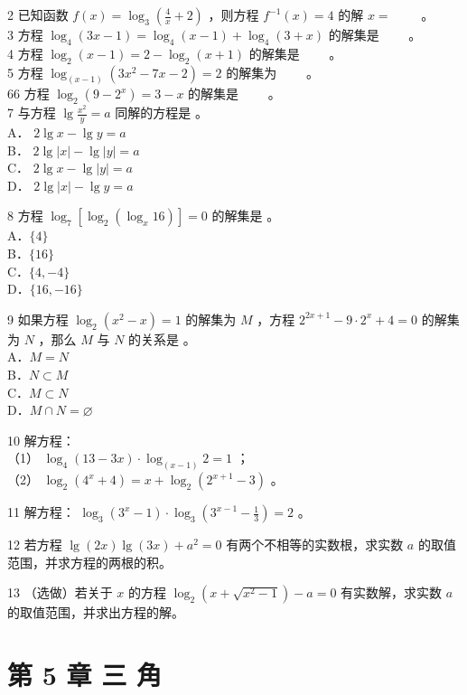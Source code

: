 \documentclass[10pt]{article}
\begin{document}
2 已知函数 \(f(x)=\log _{3}\left(\frac{4}{x}+2\right)\) ，则方程 \(f^{-1}(x)=4\) 的解 \(x=\) \(\qquad\)。\\
3 方程 \(\log _{4}(3 x-1)=\log _{4}(x-1)+\log _{4}(3+x)\) 的解集是 \(\qquad\)。\\
4 方程 \(\log _{2}(x-1)=2-\log _{2}(x+1)\) 的解集是 \(\qquad\)。\\
5 方程 \(\log _{(x-1)}\left(3 x^{2}-7 x-2\right)=2\) 的解集为 \(\qquad\)。\\
66 方程 \(\log _{2}\left(9-2^{x}\right)=3-x\) 的解集是 \(\qquad\)。\\
7 与方程 \(\lg \frac{x^{2}}{y}=a\) 同解的方程是 。\\
A． \(2 \lg x-\lg y=a\)\\
B． \(2 \lg |x|-\lg |y|=a\)\\
C． \(2 \lg x-\lg |y|=a\)\\
D． \(2 \lg |x|-\lg y=a\)

8 方程 \(\log _{7}\left[\log _{2}\left(\log _{x} 16\right)\right]=0\) 的解集是 。\\
A．\(\{4\}\)\\
B．\(\{16\}\)\\
C．\(\{4,-4\}\)\\
D．\(\{16,-16\}\)

9 如果方程 \(\log _{2}\left(x^{2}-x\right)=1\) 的解集为 \(M\) ，方程 \(2^{2 x+1}-9 \cdot 2^{x}+4=0\) 的解集为 \(N\) ，那么 \(M\) 与 \(N\) 的关系是 。\\
A．\(M=N\)\\
B．\(N \subset M\)\\
C．\(M \subset N\)\\
D．\(M \cap N=\varnothing\)

10 解方程：\\
（1） \(\log _{4}(13-3 x) \cdot \log _{(x-1)} 2=1\) ；\\
（2） \(\log _{2}\left(4^{x}+4\right)=x+\log _{2}\left(2^{x+1}-3\right)\) 。

11 解方程： \(\log _{3}\left(3^{x}-1\right) \cdot \log _{3}\left(3^{x-1}-\frac{1}{3}\right)=2\) 。

12 若方程 \(\lg (2 x) \lg (3 x)+a^{2}=0\) 有两个不相等的实数根，求实数 \(a\) 的取值范围，并求方程的两根的积。

13 （选做）若关于 \(x\) 的方程 \(\log _{2}\left(x+\sqrt{x^{2}-1}\right)-a=0\) 有实数解，求实数 \(a\) 的取值范围，并求出方程的解。

\section*{第 5 章 三 角}
\end{document}
